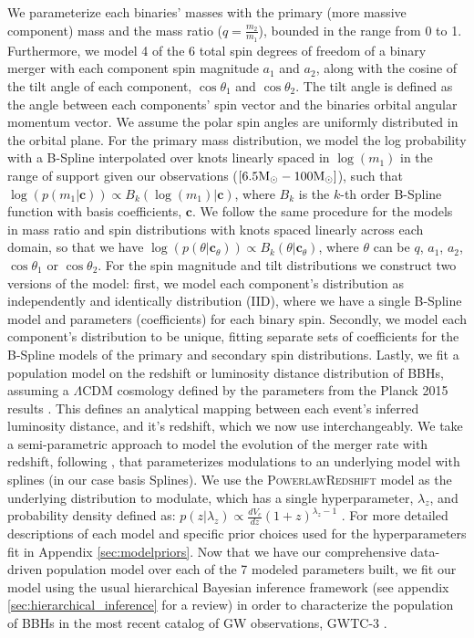 We parameterize each binaries' masses with the primary (more massive component) mass 
and the mass ratio ($q=\frac{m_2}{m_1}$), bounded in the range from 0 to 1. Furthermore, we model 4 of the 6 total 
spin degrees of freedom of a binary merger with each component spin magnitude $a_1$ and $a_2$, along with the cosine of the tilt angle of each component, 
$\cos{\theta_1}$ and $\cos{\theta_2}$. The tilt angle is defined as the angle between each components' spin vector and the binaries orbital angular momentum vector. 
We assume the polar spin angles are uniformly distributed in the orbital plane. For the primary mass distribution, we model the log probability with a B-Spline interpolated over 
knots linearly spaced in $\log(m_1)$ in the range of support given our observations ($[6.5{\rm M}_\odot-100{\rm M}_\odot]$), such that $\log(p(m_1 | \bm{c})) \propto B_{k}(\log(m_1) | \bm{c})$, where $B_{k}$ is the 
$k$-th order B-Spline function with basis coefficients, $\bm{c}$. We follow the same procedure for the models in mass ratio and spin distributions with knots spaced linearly across each domain, 
so that we have $\log(p(\theta | \bm{c}_\theta)) \propto B_{k}(\theta | \bm{c}_\theta)$, where $\theta$ can be $q$, $a_1$, $a_2$, $\cos{\theta_1}$ or $\cos{\theta_2}$. 
For the spin magnitude and tilt distributions we construct two versions of the model: first, we model  
each component's distribution as independently and identically distribution (IID), where we have a single B-Spline model and parameters (coefficients) for each binary spin. 
Secondly, we model each component's distribution to be unique, fitting separate sets of coefficients for the B-Spline models of the primary and secondary spin distributions. 
Lastly, we fit a population model on the redshift or luminosity distance distribution of BBHs, assuming a $\Lambda\mathrm{CDM}$ cosmology defined by the parameters 
from the Planck 2015 results \citep{Planck2015}. This defines an analytical mapping between each event's inferred luminosity distance, and it's redshift, which we now use interchangeably. 
We take a semi-parametric approach to model the evolution of the merger rate with redshift, following \citet{Edelman_2022ApJ}, that parameterizes modulations to an underlying model 
with splines (in our case basis Splines). We use the \textsc{PowerlawRedshift} model as the underlying distribution to modulate, which has a single hyperparameter, $\lambda_z$, and 
probability density defined as: $p(z|\lambda_z)\propto \frac{dV_c}{dz}(1+z)^{\lambda_z-1}$ \citep{Fishbach_2018redshift}. For more detailed descriptions of each model and 
specific prior choices used for the hyperparameters fit in Appendix \ref{sec:modelpriors}. Now that we have our comprehensive data-driven population model over 
each of the 7 modeled parameters built, we fit our model using the usual hierarchical Bayesian inference framework (see appendix \ref{sec:hierarchical_inference} for a review) in order to characterize 
the population of BBHs in the most recent catalog of GW observations, GWTC-3 \citep{GWTC3,o3b_astro_dist}. 